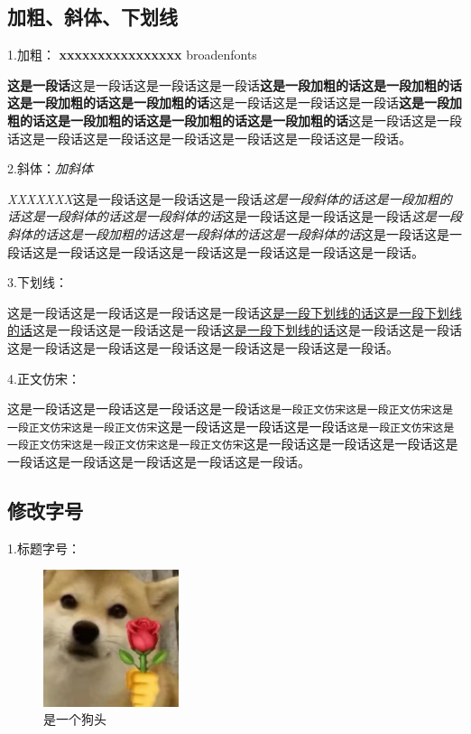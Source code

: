 \documentclass[normalsize]{article}   %
\begin{document}
		\subsection{加粗、斜体、下划线}
		
		\noindent 1.加粗： \textbf{xxxxxxxxxxxxxxxx} broadenfonts
		
		\textbf{这是一段话}这是一段话这是一段话这是一段话\textbf{这是一段加粗的话这是一段加粗的话这是一段加粗的话这是一段加粗的话}这是一段话这是一段话这是一段话\textbf{这是一段加粗的话这是一段加粗的话这是一段加粗的话这是一段加粗的话}这是一段话这是一段话这是一段话这是一段话这是一段话这是一段话这是一段话这是一段话。
		
		\noindent 2.斜体：\textit{加斜体}
		
			\textit{XXXXXXX}这是一段话这是一段话这是一段话\textit{这是一段斜体的话这是一段加粗的话这是一段斜体的话这是一段斜体的话}这是一段话这是一段话这是一段话\textit{这是一段斜体的话这是一段加粗的话这是一段斜体的话这是一段斜体的话}这是一段话这是一段话这是一段话这是一段话这是一段话这是一段话这是一段话这是一段话。
		
		\noindent 3.下划线：
		
			这是一段话这是一段话这是一段话这是一段话\underline{这是一段下划线的话这是一段下划线的话}这是一段话这是一段话这是一段话\underline{这是一段下划线的话}这是一段话这是一段话这是一段话这是一段话这是一段话这是一段话这是一段话这是一段话。
			
		\noindent 4.正文仿宋：
		
		这是一段话这是一段话这是一段话这是一段话\texttt{这是一段正文仿宋这是一段正文仿宋这是一段正文仿宋这是一段正文仿宋}这是一段话这是一段话这是一段话\texttt{这是一段正文仿宋这是一段正文仿宋这是一段正文仿宋这是一段正文仿宋}这是一段话这是一段话这是一段话这是一段话这是一段话这是一段话这是一段话这是一段话。
		
		\subsection{修改字号}
		
		\noindent 1.标题字号：
			
					\begin{figure}[htbp!]
						\centering
						\includegraphics[height=4cm]{./img/sample.png}
						\caption{是一个狗头}
						\label{fig:10}
			    	\end{figure}
		    	
\end{document}
